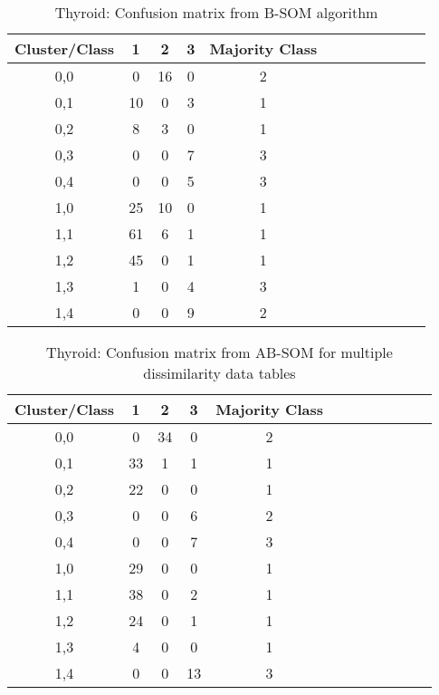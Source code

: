 \documentclass[10pt, conference, compsocconf]{IEEEtran}
\begin{document}
\begin{table}[!h]
\renewcommand{\arraystretch}{1.2}
\begin{center}
\caption{Thyroid: Confusion matrix from B-SOM algorithm}
\begin{tabular}{|c|c|c|c|c|c|c|c|c|c|c||c|}
\hline
Cluster/Class & 1 & 2 & 3 & Majority Class\\ \hline
0,0 & 0 & 16 & 0 & 2\\ \hline
0,1 & 10 & 0 & 3 & 1\\ \hline
0,2 & 8 & 3 & 0 & 1\\ \hline
0,3 & 0 & 0 & 7 & 3\\ \hline
0,4 & 0 & 0 & 5 & 3\\ \hline \hline
1,0 & 25 & 10 & 0 & 1\\ \hline
1,1 & 61 & 6 & 1 & 1\\ \hline
1,2 & 45 & 0 & 1 & 1\\ \hline
1,3 & 1 & 0 & 4 & 3\\ \hline
1,4 & 0 & 0 & 9 & 2\\ \hline

\end{tabular}
\label{thyroid_batch}
\end{center}
\end{table}

\begin{table}[!h]
\renewcommand{\arraystretch}{1.2}
\begin{center}
\caption{Thyroid: Confusion matrix from AB-SOM for multiple dissimilarity data tables}
\begin{tabular}{|c|c|c|c|c|c|c|c|c|c|c||c|}
\hline
Cluster/Class & 1 & 2 & 3 & Majority Class\\ \hline
0,0 & 0 & 34 & 0 & 2\\ \hline
0,1 & 33 & 1 & 1 & 1\\ \hline
0,2 & 22 & 0 & 0 & 1\\ \hline
0,3 & 0 & 0 & 6 & 2\\ \hline
0,4 & 0 & 0 & 7 & 3\\ \hline \hline
1,0 & 29 & 0 & 0 & 1\\ \hline
1,1 & 38 & 0 & 2 & 1\\ \hline
1,2 & 24 & 0 & 1 & 1\\ \hline
1,3 & 4 & 0 & 0 & 1\\ \hline
1,4 & 0 & 0 & 13 & 3\\ \hline

\end{tabular}
\label{thyroid_adaptativo}
\end{center}
\end{table}
\end{document}

